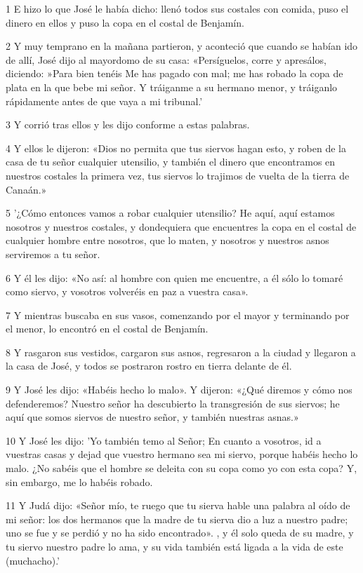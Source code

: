 \par 1 E hizo lo que José le había dicho: llenó todos sus costales con comida, puso el dinero en ellos y puso la copa en el costal de Benjamín.
\par 2 Y muy temprano en la mañana partieron, y aconteció que cuando se habían ido de allí, José dijo al mayordomo de su casa: «Persíguelos, corre y apresálos, diciendo: »Para bien tenéis Me has pagado con mal; me has robado la copa de plata en la que bebe mi señor. Y tráiganme a su hermano menor, y tráiganlo rápidamente antes de que vaya a mi tribunal.'
\par 3 Y corrió tras ellos y les dijo conforme a estas palabras.
\par 4 Y ellos le dijeron: «Dios no permita que tus siervos hagan esto, y roben de la casa de tu señor cualquier utensilio, y también el dinero que encontramos en nuestros costales la primera vez, tus siervos lo trajimos de vuelta de la tierra de Canaán.»
\par 5 '¿Cómo entonces vamos a robar cualquier utensilio? He aquí, aquí estamos nosotros y nuestros costales, y dondequiera que encuentres la copa en el costal de cualquier hombre entre nosotros, que lo maten, y nosotros y nuestros asnos serviremos a tu señor.
\par 6 Y él les dijo: «No así: al hombre con quien me encuentre, a él sólo lo tomaré como siervo, y vosotros volveréis en paz a vuestra casa».
\par 7 Y mientras buscaba en sus vasos, comenzando por el mayor y terminando por el menor, lo encontró en el costal de Benjamín.
\par 8 Y rasgaron sus vestidos, cargaron sus asnos, regresaron a la ciudad y llegaron a la casa de José, y todos se postraron rostro en tierra delante de él.
\par 9 Y José les dijo: «Habéis hecho lo malo». Y dijeron: «¿Qué diremos y cómo nos defenderemos? Nuestro señor ha descubierto la transgresión de sus siervos; he aquí que somos siervos de nuestro señor, y también nuestras asnas.»
\par 10 Y José les dijo: 'Yo también temo al Señor; En cuanto a vosotros, id a vuestras casas y dejad que vuestro hermano sea mi siervo, porque habéis hecho lo malo. ¿No sabéis que el hombre se deleita con su copa como yo con esta copa? Y, sin embargo, me lo habéis robado.
\par 11 Y Judá dijo: «Señor mío, te ruego que tu sierva hable una palabra al oído de mi señor: los dos hermanos que la madre de tu sierva dio a luz a nuestro padre; uno se fue y se perdió y no ha sido encontrado». , y él solo queda de su madre, y tu siervo nuestro padre lo ama, y ​​su vida también está ligada a la vida de este (muchacho).'
